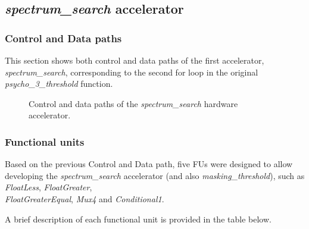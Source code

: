 \subsection{\textit{spectrum\_search} accelerator}

\subsubsection{Control and Data paths}
This section shows both control and data paths of the first accelerator, \textit{spectrum\_search}, corresponding to the second for loop in the original \textit{psycho\_3\_threshold} function.

\begin{figure}[H]
\centerline{}
\caption{Control and data paths of the \textit{spectrum\_search} hardware accelerator.}
\label{data1}
\end{figure}

\subsubsection{Functional units}
Based on the previous Control and Data path, five FUs were designed to allow developing the \textit{spectrum\_search} accelerator (and also \textit{masking\_threshold}), such as \textit{FloatLess}, \textit{FloatGreater}, \\ \textit{FloatGreaterEqual}, \textit{Mux4} and \textit{Conditional1}.

A brief description of each functional unit is provided in the table below.

\vspace{0.5cm}

